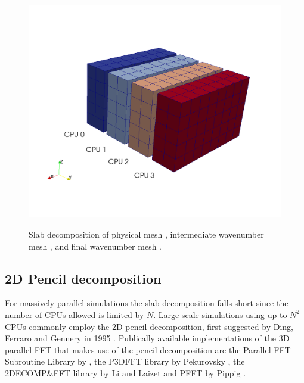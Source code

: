 \documentclass[11pt, oneside]{article}
\begin{document}
\begin{figure}[t!]
{  \includegraphics[scale=0.2]{slabZ3.png}
  \label{slabsubfig2}
  }
\caption{Slab decomposition of physical mesh , intermediate wavenumber mesh , and final wavenumber mesh .  }
\label{fig:Slabdecomp}
\end{figure}

\subsection{2D Pencil decomposition}
\label{pencil2D}

For massively parallel simulations the slab decomposition falls short since the number of CPUs allowed is limited by $N$. Large-scale simulations using up to $N^2$ CPUs commonly employ the 2D pencil decomposition, first suggested by Ding, Ferraro and Gennery in 1995 \cite{Ding95}. Publically available implementations of the 3D parallel FFT that makes use of the pencil decomposition are the Parallel FFT Subroutine Library by \cite{PlimptonFFT}, the P3DFFT library by Pekurovsky \cite{p3dfft, pekurovsky2012}, the 2DECOMP\&FFT library by Li and Laizet \cite{Li2010} and PFFT by Pippig \cite{Pi13}.
\end{document}
